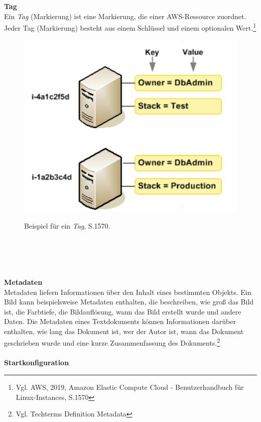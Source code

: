 \\\\
\textbf{Tag}\\
Ein \textit{Tag} (Markierung) ist eine Markierung, die einer AWS-Ressource zuordnet. Jeder Tag (Markierung) besteht aus einem Schlüssel und einem optionalen Wert.\footnote{Vgl. AWS, 2019, Amazon Elastic Compute Cloud - Benutzerhandbuch für Linux-Instances, S.1570\cite{AMZ26}}
\begin{figure}[h!]
  \centering
  \includegraphics[scale=0.4]{sources/TagExample}
  \caption[Beispiel für ein Tag]{}\label{fig:TagExample}
  Beispiel für ein \textit{Tag}{\cite{AMZ26}, S.1570}.
\end{figure}
\\\\
\\\\
\textbf{Metadaten}\\
Metadaten liefern Informationen über den Inhalt eines bestimmten Objekts. Ein Bild kann beispielsweise Metadaten enthalten, die beschreiben, wie groß das Bild ist, die Farbtiefe, die Bildauflösung, wann das Bild erstellt wurde und andere Daten. Die Metadaten eines Textdokuments können Informationen darüber enthalten, wie lang das Dokument ist, wer der Autor ist, wann das Dokument geschrieben wurde und eine kurze Zusammenfassung des Dokuments.\footnote{Vgl. Techterms Definition Metadata\cite{MET}}
\\\\
\textbf{Startkonfiguration}\\
